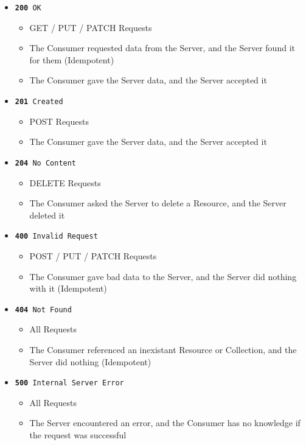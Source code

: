 \documentclass{book}
\begin{document}
\begin{itemize}
\item \texttt{\textbf{200} OK}
    \begin{itemize}
    \item GET / PUT / PATCH  Requests
    \item The Consumer requested data from the Server, and the Server found it for them (Idempotent)
    \item The Consumer gave the Server data, and the Server accepted it
    \end{itemize}
\item \texttt{\textbf{201} Created}
    \begin{itemize}
    \item POST Requests
    \item The Consumer gave the Server data, and the Server accepted it
    \end{itemize}
\item \texttt{\textbf{204} No Content}
    \begin{itemize}
    \item DELETE Requests
    \item The Consumer asked the Server to delete a Resource, and the Server deleted it
    \end{itemize}
\item \texttt{\textbf{400} Invalid Request}
    \begin{itemize}
    \item POST / PUT / PATCH Requests
    \item The Consumer gave bad data to the Server, and the Server did nothing with it (Idempotent)
    \end{itemize}
\item \texttt{\textbf{404} Not Found}
    \begin{itemize}
    \item All Requests
    \item The Consumer referenced an inexistant Resource or Collection, and the Server did nothing (Idempotent)
    \end{itemize}
\item \texttt{\textbf{500} Internal Server Error}
    \begin{itemize}
    \item All Requests
    \item The Server encountered an error, and the Consumer has no knowledge if the request was successful
    \end{itemize}
\end{itemize}
\end{document}
